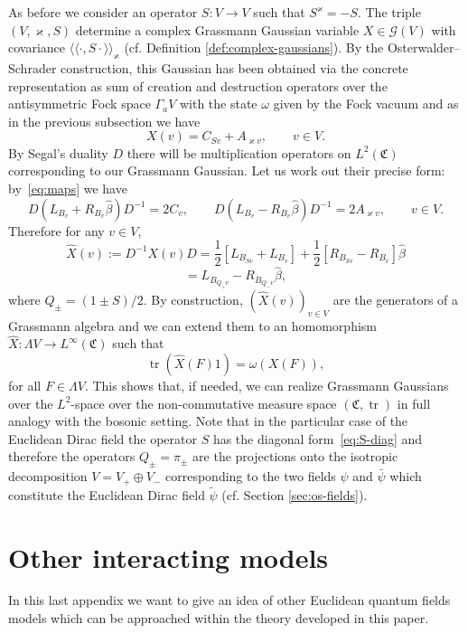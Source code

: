 \documentclass[11pt]{article}
\newcommand{\assign}{:=}
\newcommand{\llangle}{{\langle\!\langle}}
\newcommand{\rrangle}{{\rangle\!\rangle}}
\newcommand{\tmop}[1]{\ensuremath{\operatorname{#1}}}
\begin{document}
As before we consider an operator $S : V \rightarrow V$ such that
$S^{\varkappa} = - S$. The triple $(V, \varkappa, S)$ determine a complex
Grassmann Gaussian variable $X \in \mathcal{G} (V)$ with covariance $\llangle
\cdot, S \cdot \rrangle_{\varkappa}$ (cf. Definition
\ref{def:complex-gaussians}). By the Osterwalder--Schrader construction, this
Gaussian has been obtained via the concrete representation as sum of creation
and destruction operators over the antisymmetric Fock space $\Gamma_a V$ with
the state $\omega$ given by the Fock vacuum and as in the previous subsection
we have
\[ X (v) = C_{S v} + A_{\varkappa v}, \qquad v \in V. \]
By Segal's duality $D$ there will be multiplication operators on $L^2
(\mathfrak{C})$ corresponding to our Grassmann Gaussian. Let us work out their
precise form: by~{\eqref{eq:maps}} we have
\[ D (L_{B_v} + R_{B_v} \hat{\beta}) D^{- 1} = 2 C_v, \qquad D (L_{B_v} -
   R_{B_v} \hat{\beta}) D^{- 1} = 2 A_{\varkappa v}, \qquad v \in V. \]
Therefore for any $v \in V$,
\[ \hat{X} (v) \assign D^{- 1} X (v) D = \frac{1}{2} [L_{B_{S v}} + L_{B_v}] +
   \frac{1}{2} [R_{B_{S v}} - R_{B_v}] \hat{\beta} \]
\[ = L_{B_{Q_+ v}} - R_{B_{Q_- v}} \hat{\beta}, \]
where $Q_{\pm} = (1 \pm S) / 2$. By construction, $(\hat{X} (v))_{v \in V}$
are the generators of a Grassmann algebra and we can extend them to an
homomorphism $\hat{X} : \Lambda V \rightarrow L^{\infty} (\mathfrak{C})$ such
that
\[ \tmop{tr} (\hat{X} (F) 1) = \omega (X (F)), \]
for all $F \in \Lambda V$. This shows that, if needed, we can realize
Grassmann Gaussians over the $L^2$-space over the non-commutative measure
space $(\mathfrak{C}, \tmop{tr})$ in full analogy with the bosonic setting.
Note that in the particular case of the Euclidean Dirac field the operator $S$
has the diagonal form~{\eqref{eq:S-diag}} and therefore the operators $Q_{\pm}
= \pi_{\pm}$ are the projections onto the isotropic decomposition $V = V_+
\oplus V_-$ corresponding to the two fields $\psi$ and $\bar{\psi}$ which
constitute the Euclidean Dirac field $\tilde{\psi}$ (cf. Section
\ref{sec:os-fields}).

\section{Other interacting models}\label{appendix_models}

In this last appendix we want to give an idea of other Euclidean quantum
fields models which can be approached within the theory developed in this
paper.

\
\end{document}
